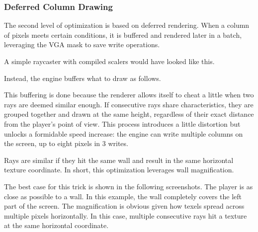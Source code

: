 \subsubsection{Deferred Column Drawing}
The second level of optimization is based on deferred rendering. When a column of pixels meets certain conditions, it is buffered and rendered later in a batch, leveraging the VGA mask to save write operations.\\
\par 
A simple raycaster with compiled scalers would have looked like this.\\

\begin{minipage}{\textwidth}

\end{minipage}
\par
Instead, the engine buffers what to draw as follows.\\
\par
\begin{minipage}{\textwidth}

\end{minipage}

\par
This buffering is done because the renderer allows itself to cheat a little when two rays are deemed similar enough. If consecutive rays share characteristics, they are grouped together and drawn at the same height, regardless of their exact distance from the player's point of view. This process introduces a little distortion but unlocks a formidable speed increase: the engine can write multiple columns on the screen, up to eight pixels in 3 writes.\\
\par
Rays are similar if they hit the same wall and result in the same  horizontal texture coordinate. In short, this optimization leverages wall magnification.\\
\par
The best case for this trick is shown in the following screenshots. The player is as close as possible to a wall. In this example, the wall completely covers the left part of the screen. The magnification is obvious given how texels spread across multiple pixels horizontally. In this case, multiple consecutive rays hit a texture at the same horizontal coordinate.\\
\par
\par

